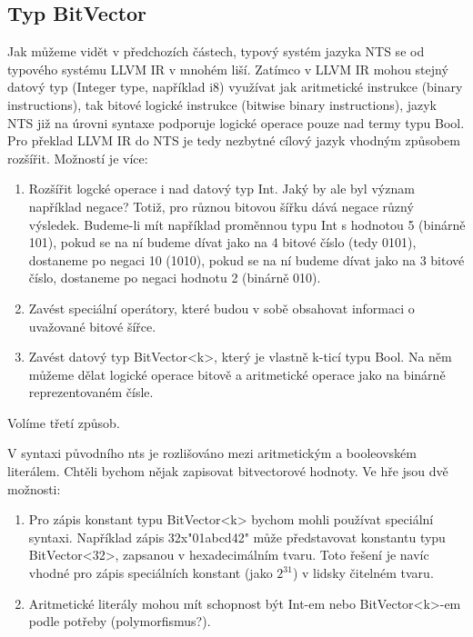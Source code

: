 \documentclass[10pt,a4paper,notitlepage]{report}
\begin{document}
\subsection{Typ BitVector}
Jak můžeme vidět v předchozích částech, typový systém jazyka NTS se od typového systému LLVM IR 
v mnohém liší. Zatímco v LLVM IR mohou stejný datový typ (Integer type, například i8) využívat jak aritmetické instrukce (binary instructions), tak bitové logické instrukce (bitwise binary instructions), jazyk NTS již na úrovni syntaxe podporuje logické operace pouze nad termy typu Bool. Pro překlad LLVM IR do NTS je tedy nezbytné cílový jazyk vhodným způsobem rozšířit. Možností je více:
\begin{enumerate}
\item Rozšířit logcké operace i nad datový typ Int. Jaký by ale byl význam například negace? Totiž, pro různou bitovou šířku dává negace různý výsledek. Budeme-li mít například proměnnou typu Int s hodnotou 5 (binárně 101), pokud se na ní budeme dívat jako na 4 bitové číslo (tedy 0101), dostaneme po negaci 10 (1010), pokud se na ní budeme dívat jako na 3 bitové číslo, dostaneme po negaci hodnotu 2 (binárně 010). 

\item Zavést speciální operátory, které budou v sobě obsahovat informaci o uvažované bitové šířce.

\item Zavést datový typ BitVector<k>, který je vlastně k-ticí typu Bool. Na něm můžeme dělat logické operace bitově a aritmetické operace jako na binárně reprezentovaném čísle. 
\end{enumerate}

Volíme třetí způsob.

V syntaxi původního nts je rozlišováno mezi aritmetickým a booleovském literálem. Chtěli bychom nějak zapisovat bitvectorové hodnoty. Ve hře jsou dvě možnosti:

\begin{enumerate}

\item Pro zápis konstant typu BitVector<k> bychom mohli používat speciální syntaxi. Například zápis 32x"01abcd42" může představovat konstantu typu BitVector<32>, zapsanou v hexadecimálním tvaru. Toto řešení je navíc vhodné pro zápis speciálních konstant (jako $2^{31}$) v lidsky čitelném tvaru. 

\item Aritmetické literály mohou mít schopnost být Int-em nebo BitVector<k>-em podle potřeby (polymorfismus?).

\end{enumerate}
\end{document}
